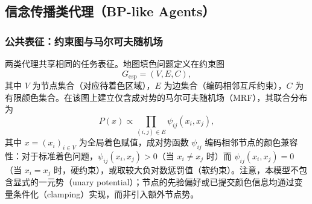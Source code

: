 


\subsection{信念传播类代理（BP-like Agents）}
\label{sec:bp-agents}

\subsubsection{公共表征：约束图与马尔可夫随机场}
两类代理共享相同的任务表征。地图填色问题定义在约束图
\begin{equation}
  G_{\mathrm{csp}} = (V, E, C),
\end{equation}
其中 $V$ 为节点集合（对应待着色区域），$E$ 为边集合（编码相邻互斥约束），$C$ 为有限颜色集合。在该图上建立仅含成对势的马尔可夫随机场（MRF），其联合分布为
\begin{equation}
  P(x) \propto \prod_{(i,j)\in E} \psi_{ij}(x_i, x_j),
\end{equation}
其中 $x = (x_i)_{i\in V}$ 为全局着色赋值，成对势函数 $\psi_{ij}$ 编码相邻节点的颜色兼容性：对于标准着色问题，$\psi_{ij}(x_i, x_j) > 0$（当 $x_i \neq x_j$ 时）而 $\psi_{ij}(x_i, x_j) = 0$（当 $x_i = x_j$ 时，硬约束），或取较大负对数惩罚值（软约束）。注意，本模型不包含显式的一元势（unary potential）；节点的先验偏好或已提交颜色信息均通过变量条件化（clamping）实现，而非引入额外节点势。

